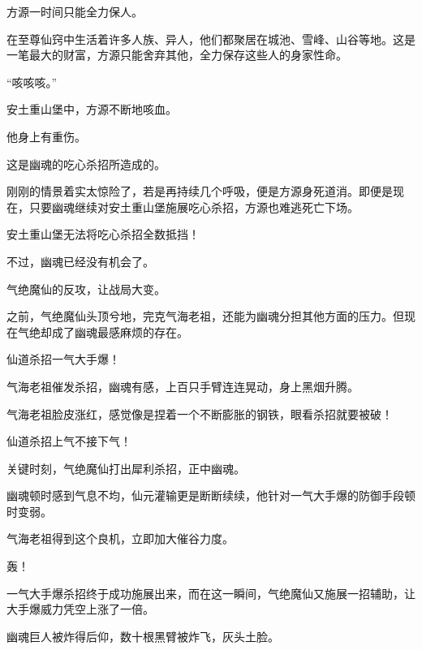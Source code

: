 \begin{this_body}
方源一时间只能全力保人。

在至尊仙窍中生活着许多人族、异人，他们都聚居在城池、雪峰、山谷等地。这是一笔最大的财富，方源只能舍弃其他，全力保存这些人的身家性命。

“咳咳咳。”

安土重山堡中，方源不断地咳血。

他身上有重伤。

这是幽魂的吃心杀招所造成的。

刚刚的情景着实太惊险了，若是再持续几个呼吸，便是方源身死道消。即便是现在，只要幽魂继续对安土重山堡施展吃心杀招，方源也难逃死亡下场。

安土重山堡无法将吃心杀招全数抵挡！

不过，幽魂已经没有机会了。

气绝魔仙的反攻，让战局大变。

之前，气绝魔仙头顶兮地，完克气海老祖，还能为幽魂分担其他方面的压力。但现在气绝却成了幽魂最感麻烦的存在。

仙道杀招一气大手爆！

气海老祖催发杀招，幽魂有感，上百只手臂连连晃动，身上黑烟升腾。

气海老祖脸皮涨红，感觉像是捏着一个不断膨胀的钢铁，眼看杀招就要被破！

仙道杀招上气不接下气！

关键时刻，气绝魔仙打出犀利杀招，正中幽魂。

幽魂顿时感到气息不均，仙元灌输更是断断续续，他针对一气大手爆的防御手段顿时变弱。

气海老祖得到这个良机，立即加大催谷力度。

轰！

一气大手爆杀招终于成功施展出来，而在这一瞬间，气绝魔仙又施展一招辅助，让大手爆威力凭空上涨了一倍。

幽魂巨人被炸得后仰，数十根黑臂被炸飞，灰头土脸。

\end{this_body}

